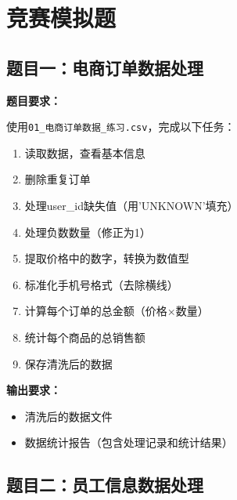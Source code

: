 \documentclass[12pt,a4paper]{article}
\begin{document}
\section{竞赛模拟题}

\subsection{题目一：电商订单数据处理}

\begin{practicebox}[竞赛模拟题1]
\textbf{题目要求：}

使用\texttt{01\_电商订单数据\_练习.csv}，完成以下任务：

\begin{enumerate}
    \item 读取数据，查看基本信息
    \item 删除重复订单
    \item 处理user\_id缺失值（用'UNKNOWN'填充）
    \item 处理负数数量（修正为1）
    \item 提取价格中的数字，转换为数值型
    \item 标准化手机号格式（去除横线）
    \item 计算每个订单的总金额（价格×数量）
    \item 统计每个商品的总销售额
    \item 保存清洗后的数据
\end{enumerate}

\textbf{输出要求：}
\begin{itemize}
    \item 清洗后的数据文件
    \item 数据统计报告（包含处理记录和统计结果）
\end{itemize}
\end{practicebox}

\subsection{题目二：员工信息数据处理}
\end{document}
